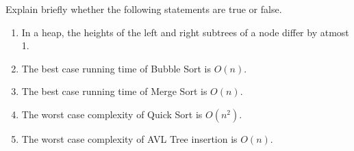 Explain briefly whether the following statements are true or false. 

\begin{enumerate}
\item  In a heap, the heights of the left and right subtrees of a node
differ by atmost 1.  
\item  The best case running time of Bubble Sort is $O(n)$.
\item  The best case running time of Merge Sort is $O(n)$.
\item  The worst case complexity of Quick Sort is $O(n^2)$.
\item  The worst case complexity of AVL Tree insertion is $O(n)$.
\end{enumerate}

